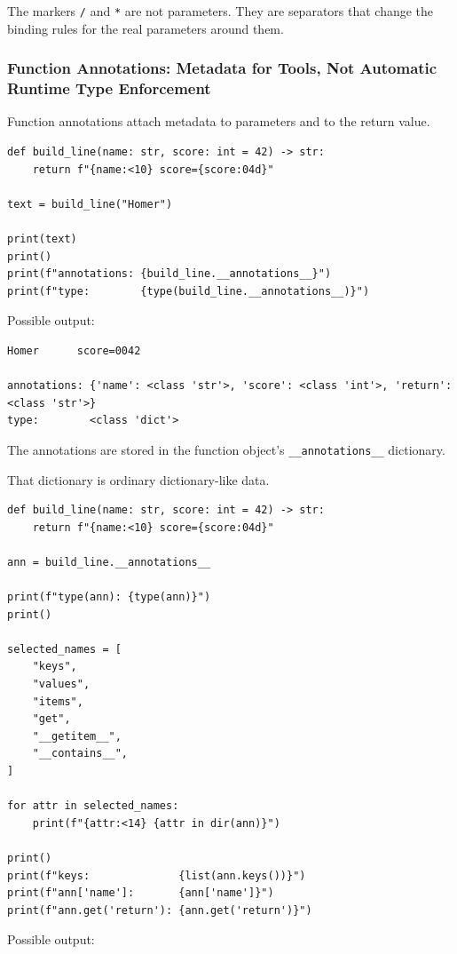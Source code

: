 The markers \texttt{/} and \texttt{*} are not parameters. They are separators that change the binding rules for the real parameters around them.

\subsubsection{Function Annotations: Metadata for Tools, Not Automatic Runtime Type Enforcement}

Function annotations attach metadata to parameters and to the return value.

\begin{verbatim}
def build_line(name: str, score: int = 42) -> str:
    return f"{name:<10} score={score:04d}"

text = build_line("Homer")

print(text)
print()
print(f"annotations: {build_line.__annotations__}")
print(f"type:        {type(build_line.__annotations__)}")
\end{verbatim}

Possible output:

\begin{verbatim}
Homer      score=0042

annotations: {'name': <class 'str'>, 'score': <class 'int'>, 'return': <class 'str'>}
type:        <class 'dict'>
\end{verbatim}

The annotations are stored in the function object's \texttt{\_\_annotations\_\_} dictionary.

That dictionary is ordinary dictionary-like data.

\begin{verbatim}
def build_line(name: str, score: int = 42) -> str:
    return f"{name:<10} score={score:04d}"

ann = build_line.__annotations__

print(f"type(ann): {type(ann)}")
print()

selected_names = [
    "keys",
    "values",
    "items",
    "get",
    "__getitem__",
    "__contains__",
]

for attr in selected_names:
    print(f"{attr:<14} {attr in dir(ann)}")

print()
print(f"keys:              {list(ann.keys())}")
print(f"ann['name']:       {ann['name']}")
print(f"ann.get('return'): {ann.get('return')}")
\end{verbatim}

Possible output:


